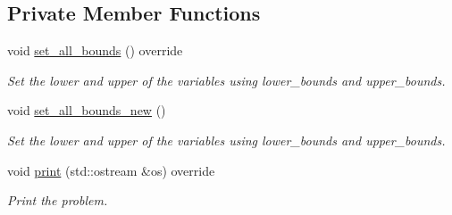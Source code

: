 \subsection*{Private Member Functions}
\begin{DoxyCompactItemize}
\item 
void \hyperlink{classglpk__solver_a452c9cc528757df64c8afd83274e5ae5}{set\+\_\+all\+\_\+bounds} () override
\begin{DoxyCompactList}\small\item\em Set the lower and upper of the variables using lower\+\_\+bounds and upper\+\_\+bounds. \end{DoxyCompactList}\item 
void \hyperlink{classglpk__solver_a20a1d445c2a04318a6161207e2528d17}{set\+\_\+all\+\_\+bounds\+\_\+new} ()
\begin{DoxyCompactList}\small\item\em Set the lower and upper of the variables using lower\+\_\+bounds and upper\+\_\+bounds. \end{DoxyCompactList}\item 
void \hyperlink{classglpk__solver_a0a3f1dcdb065e42d04a45a6cd6864b90}{print} (std\+::ostream \&os) override
\begin{DoxyCompactList}\small\item\em Print the problem. \end{DoxyCompactList}\end{DoxyCompactItemize}
